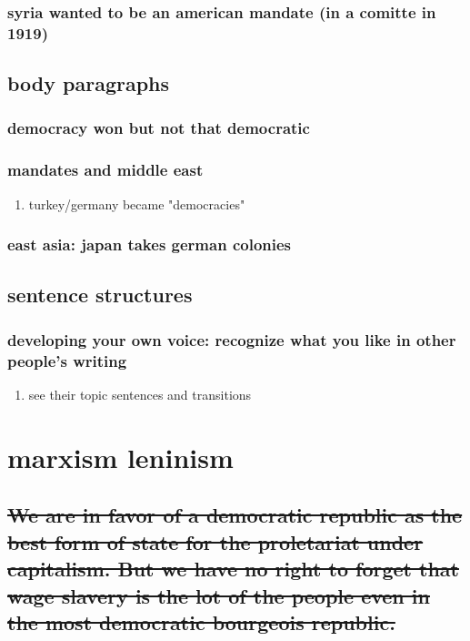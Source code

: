 \documentclass[letterpaper]{article}
\begin{document}
\subsubsection{syria wanted to be an american mandate (in a comitte in 1919)}
\label{sec:orged8b756}
\subsection{body paragraphs}
\label{sec:orgecb8cc0}
\subsubsection{democracy won but not that democratic}
\label{sec:orge7373f3}
\subsubsection{mandates and middle east}
\label{sec:org7e407b2}
\begin{enumerate}
\item turkey/germany became "democracies"
\label{sec:org03b103f}
\end{enumerate}
\subsubsection{east asia: japan takes german colonies}
\label{sec:orgf31a8af}
\subsection{sentence structures}
\label{sec:org6b32b9d}
\subsubsection{developing your own voice: recognize what you like in other people's writing}
\label{sec:org8fe564a}
\begin{enumerate}
\item see their topic sentences and transitions
\label{sec:org65aa9d3}
\end{enumerate}
\section{marxism leninism}
\label{sec:orgcff8cfe}
\subsection{\sout{We are in favor of a democratic republic as the best form of state for the proletariat under capitalism. But we have no right to forget that wage slavery is the lot of the people even in the most democratic bourgeois republic.}}
\label{sec:orgb64d573}
\end{document}
